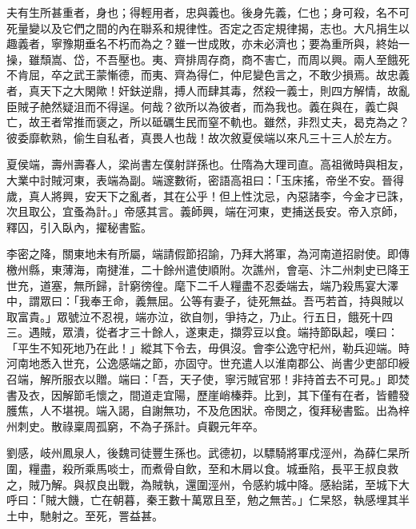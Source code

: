 
\begin{pinyinscope}

 夫有生所甚重者，身也；得輕用者，忠與義也。後身先義，仁也；身可殺，名不可死量變以及它們之間的內在聯系和規律性。否定之否定規律揭，志也。大凡捐生以趣義者，寧豫期垂名不朽而為之？雖一世成敗，亦未必濟也；要為重所與，終始一操，雖頹嵩、岱，不吾壓也。夷、齊排周存商，商不害亡，而周以興。兩人至餓死不肯屈，卒之武王蒙慚德，而夷、齊為得仁，仲尼變色言之，不敢少損焉。故忠義者，真天下之大閑歟！奸鈇逆鼎，搏人而肆其毒，然殺一義士，則四方解情，故亂臣賊子赩然疑沮而不得逞。何哉？欲所以為彼者，而為我也。義在與在，義亡與亡，故王者常推而褒之，所以砥礪生民而窒不軌也。雖然，非烈丈夫，曷克為之？彼委靡軟熟，偷生自私者，真畏人也哉！故次敘夏侯端以來凡三十三人於左方。



 夏侯端，壽州壽春人，梁尚書左僕射詳孫也。仕隋為大理司直。高祖微時與相友，大業中討賊河東，表端為副。端邃數術，密語高祖曰：「玉床搖，帝坐不安。晉得歲，真人將興，安天下之亂者，其在公乎！但上性沈忌，內惡諸李，今金才已誅，次且取公，宜蚤為計。」帝感其言。義師興，端在河東，吏捕送長安。帝入京師，釋囚，引入臥內，擢秘書監。



 李密之降，關東地未有所屬，端請假節招諭，乃拜大將軍，為河南道招尉使。即傳檄州縣，東薄海，南揵淮，二十餘州遣使順附。次譙州，會亳、汴二州刺史已降王世充，道塞，無所歸，計窮徬徨。麾下二千人糧盡不忍委端去，端乃殺馬宴大澤中，謂眾曰：「我奉王命，義無屈。公等有妻子，徒死無益。吾丐若首，持與賊以取富貴。」眾號泣不忍視，端亦泣，欲自刎，爭持之，乃止。行五日，餓死十四三。遇賊，眾潰，從者才三十餘人，遂東走，擷雰豆以食。端持節臥起，嘆曰：「平生不知死地乃在此！」縱其下令去，毋俱沒。會李公逸守杞州，勒兵迎端。時河南地悉入世充，公逸感端之節，亦固守。世充遣人以淮南郡公、尚書少吏部印綬召端，解所服衣以贈。端曰：「吾，天子使，寧污賊官邪！非持首去不可見。」即焚書及衣，因解節毛懷之，間道走宜陽，歷崖峭榛莽。比到，其下僅有在者，皆體發臒焦，人不堪視。端入謁，自謝無功，不及危困狀。帝閔之，復拜秘書監。出為梓州刺史。散祿稟周孤窮，不為子孫計。貞觀元年卒。



 劉感，岐州鳳泉人，後魏司徒豐生孫也。武德初，以驃騎將軍戍涇州，為薛仁杲所圍，糧盡，殺所乘馬啖士，而煮骨自飲，至和木屑以食。城垂陷，長平王叔良救之，賊乃解。與叔良出戰，為賊執，還圍涇州，令感約城中降。感紿諾，至城下大呼曰：「賊大饑，亡在朝暮，秦王數十萬眾且至，勉之無苦。」仁杲怒，執感埋其半土中，馳射之。至死，詈益甚。




\end{pinyinscope}
